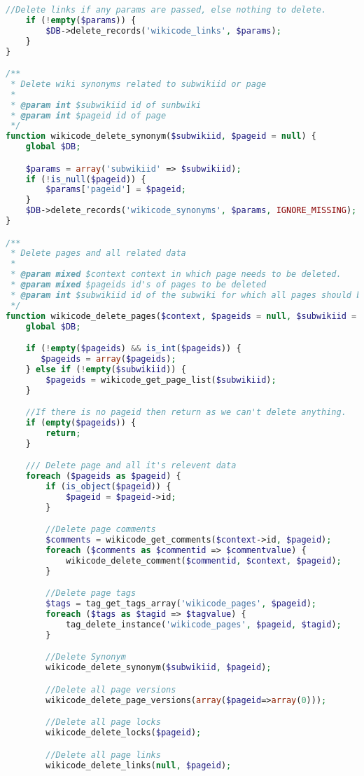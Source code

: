 \begin{lstlisting}[language=PHP]
    //Delete links if any params are passed, else nothing to delete.
    if (!empty($params)) {
        $DB->delete_records('wikicode_links', $params);
    }
}

/**
 * Delete wiki synonyms related to subwikiid or page
 *
 * @param int $subwikiid id of sunbwiki
 * @param int $pageid id of page
 */
function wikicode_delete_synonym($subwikiid, $pageid = null) {
    global $DB;

    $params = array('subwikiid' => $subwikiid);
    if (!is_null($pageid)) {
        $params['pageid'] = $pageid;
    }
    $DB->delete_records('wikicode_synonyms', $params, IGNORE_MISSING);
}

/**
 * Delete pages and all related data
 *
 * @param mixed $context context in which page needs to be deleted.
 * @param mixed $pageids id's of pages to be deleted
 * @param int $subwikiid id of the subwiki for which all pages should be deleted
 */
function wikicode_delete_pages($context, $pageids = null, $subwikiid = null) {
    global $DB;

    if (!empty($pageids) && is_int($pageids)) {
       $pageids = array($pageids);
    } else if (!empty($subwikiid)) {
        $pageids = wikicode_get_page_list($subwikiid);
    }

    //If there is no pageid then return as we can't delete anything.
    if (empty($pageids)) {
        return;
    }

    /// Delete page and all it's relevent data
    foreach ($pageids as $pageid) {
        if (is_object($pageid)) {
            $pageid = $pageid->id;
        }

        //Delete page comments
        $comments = wikicode_get_comments($context->id, $pageid);
        foreach ($comments as $commentid => $commentvalue) {
            wikicode_delete_comment($commentid, $context, $pageid);
        }

        //Delete page tags
        $tags = tag_get_tags_array('wikicode_pages', $pageid);
        foreach ($tags as $tagid => $tagvalue) {
            tag_delete_instance('wikicode_pages', $pageid, $tagid);
        }

        //Delete Synonym
        wikicode_delete_synonym($subwikiid, $pageid);

        //Delete all page versions
        wikicode_delete_page_versions(array($pageid=>array(0)));

        //Delete all page locks
        wikicode_delete_locks($pageid);

        //Delete all page links
        wikicode_delete_links(null, $pageid);


\end{lstlisting}
